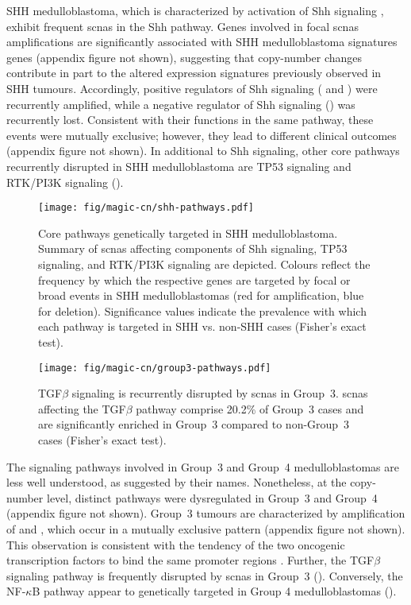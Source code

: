 SHH medulloblastoma, which is characterized by activation of Shh signaling , exhibit frequent \gls{scnas} in the Shh pathway. Genes involved in focal \gls{scnas} amplifications are significantly associated with SHH medulloblastoma signatures genes (appendix figure not shown), suggesting that copy-number changes contribute in part to the altered expression signatures previously observed in SHH tumours. Accordingly, positive regulators of Shh signaling ( and ) were recurrently amplified, while a negative regulator of Shh signaling () was recurrently lost. Consistent with their functions in the same pathway, these events were mutually exclusive; however, they lead to different clinical outcomes (appendix figure not shown). In additional to Shh signaling, other core pathways recurrently disrupted in SHH medulloblastoma are TP53 signaling and RTK/PI3K signaling ().

\begin{SCfigure}[5]
	\centering
	\texttt{[image: fig/magic-cn/shh-pathways.pdf]}
	\caption[Core pathways genetically targeted in SHH medulloblastoma]
	{
	Core pathways genetically targeted in SHH medulloblastoma.
	Summary of \gls{scnas} affecting components of Shh signaling, TP53 signaling, and RTK/PI3K signaling are depicted. Colours reflect the frequency by which the respective genes are targeted by focal or broad events in SHH medulloblastomas (red for amplification, blue for deletion). Significance values indicate the prevalence with which each pathway is targeted in SHH vs. non-SHH cases (Fisher's exact test).
	}
	\label{fig:shh-pathways}
\end{SCfigure}

\begin{SCfigure}[5][b]
	\centering
	\texttt{[image: fig/magic-cn/group3-pathways.pdf]}
	\caption[TGF$\beta$ signaling is recurrently disrupted by \gls{scnas} in Group~3]
	{
	TGF$\beta$ signaling is recurrently disrupted by \gls{scnas} in Group~3.
	\gls{scnas} affecting the TGF$\beta$ pathway comprise 20.2\% of Group~3 cases and are significantly enriched in Group~3 compared to non-Group~3 cases (Fisher's exact test).
	}
	\label{fig:group3-pathways}
\end{SCfigure}

\clearpage

The signaling pathways involved in Group~3 and Group~4 medulloblastomas are less well understood, as suggested by their names. Nonetheless, at the copy-number level, distinct pathways were dysregulated in Group~3 and Group~4 (appendix figure not shown). Group~3 tumours are characterized by amplification of  and , which occur in a mutually exclusive pattern (appendix figure not shown). This observation is consistent with the tendency of the two oncogenic transcription factors to bind the same promoter regions . Further, the TGF$\beta$ signaling pathway is frequently disrupted by \gls{scnas} in Group~3 (). Conversely, the NF-$\kappa$B pathway appear to genetically targeted in Group 4 medulloblastomas ().

